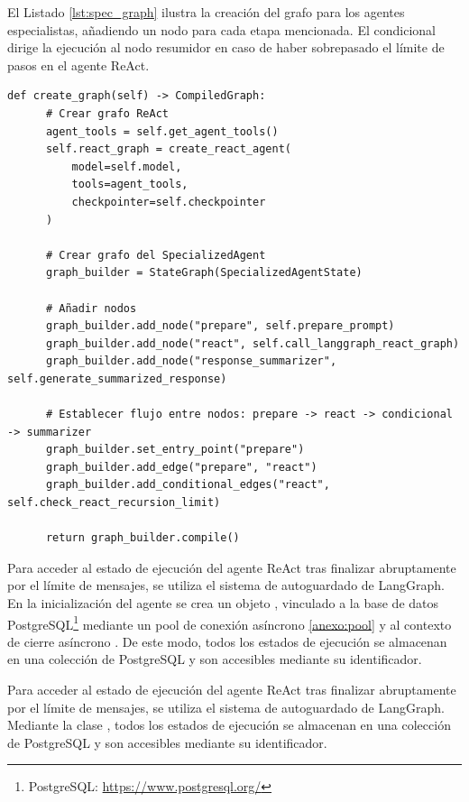 El Listado \ref{lst:spec_graph} ilustra la creación del grafo para los agentes especialistas, añadiendo un nodo para cada etapa mencionada. El condicional  dirige la ejecución al nodo resumidor en caso de haber sobrepasado el límite de pasos en el agente ReAct.

\begin{lstlisting}[caption={\protect\opus{create_graph}: grafo de agentes especializados},label={lst:spec_graph}]
  def create_graph(self) -> CompiledGraph:
      # Crear grafo ReAct
      agent_tools = self.get_agent_tools()
      self.react_graph = create_react_agent(
          model=self.model,
          tools=agent_tools,
          checkpointer=self.checkpointer
      )

      # Crear grafo del SpecializedAgent
      graph_builder = StateGraph(SpecializedAgentState)

      # Añadir nodos 
      graph_builder.add_node("prepare", self.prepare_prompt)
      graph_builder.add_node("react", self.call_langgraph_react_graph)
      graph_builder.add_node("response_summarizer", self.generate_summarized_response)

      # Establecer flujo entre nodos: prepare -> react -> condicional -> summarizer 
      graph_builder.set_entry_point("prepare")
      graph_builder.add_edge("prepare", "react")
      graph_builder.add_conditional_edges("react", self.check_react_recursion_limit)

      return graph_builder.compile()
\end{lstlisting}

Para acceder al estado de ejecución del agente ReAct tras finalizar abruptamente por el límite de mensajes, se utiliza el sistema de autoguardado de LangGraph. En la inicialización del agente se crea un objeto , vinculado a la base de datos PostgreSQL\footnote{PostgreSQL: \url{https://www.postgresql.org/}} mediante un pool de conexión asíncrono \ref{anexo:pool} y al contexto de cierre asíncrono . De este modo, todos los estados de ejecución se almacenan en una colección de PostgreSQL y son accesibles mediante su identificador. 


Para acceder al estado de ejecución del agente ReAct tras finalizar abruptamente por el límite de mensajes, se utiliza el sistema de autoguardado de LangGraph. Mediante la clase , todos los estados de ejecución se almacenan en una colección de PostgreSQL y son accesibles mediante su identificador. 

